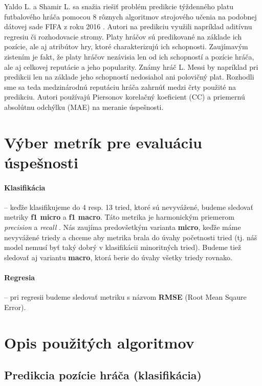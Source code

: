 \documentclass[runningheads]{llncs}
\begin{document}
Yaldo L. a Shamir L. sa snažia riešiť problém predikcie týždenného platu futbalového hráča pomocou 8 rôznych algoritmov strojového učenia na podobnej dátovej sade FIFA z roku 2016 \cite{yaldo2017}. Autori na predikciu využili napríklad aditívnu regresiu či rozhodovacie stromy. Platy hráčov sú predikované na základe ich pozície, ale aj atribútov hry, ktoré charakterizujú ich schopnosti.
Zaujímavým zistením je fakt, že platy hráčov nezávisia len od ich schopností a pozície hráča, ale aj celkovej reputácie a jeho popularity. Známy hráč L. Messi by napríklad pri predikcii len na základe jeho schopností nedosiahol ani polovičný plat. Rozhodli sme sa teda medzinárodnú reputáciu hráča zahrnúť medzi črty použité na predikciu.
Autori používajú Piersonov korelačný koeficient (CC) a priemernú absolútnu odchýlku (MAE) na meranie úspešnosti.


\section{Výber metrík pre evaluáciu úspešnosti}

\paragraph{Klasifikácia} -- keďže klasifikujeme do 4 resp. 13 tried, ktoré sú nevyvážené, budeme sledovať metriky \textbf{f1 micro} a \textbf{f1 macro}.
Táto metrika je harmonickým priemerom \textit{precision} a \textit{recall} \cite{opitz2019macro}.
Nás zaujíma predovšetkým varianta \textbf{micro}, keďže máme nevyvážené triedy a chceme aby metrika brala do úvahy početnosti tried (tj. náš model nemusí byť taký dobrý v klasifikácii minoritných tried). Budeme tiež sledovať aj variantu \textbf{macro}, ktorá berie do úvahy všetky triedy rovnako.

\paragraph{Regresia} -- pri regresii budeme sledovať metriku s názvom \textbf{RMSE} (Root Mean Sqaure Error).

\section{Opis použitých algoritmov}

\subsection{Predikcia pozície hráča (klasifikácia)}
\end{document}
